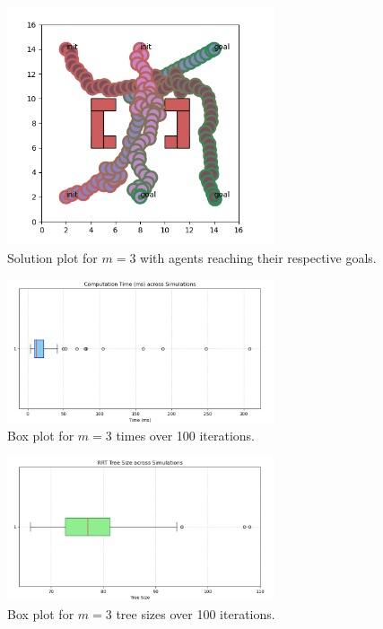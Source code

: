\documentclass{article}
\begin{document}
\begin{figure}[H]
    \centering
    \includegraphics[width=0.7\textwidth]{1b3plot.png} 
    \caption{Solution plot for \(m = 3\) with agents reaching their respective goals.}
    \label{fig:1b3plot}
\end{figure}

\begin{figure}[H]
    \centering
    \includegraphics[width=0.7\textwidth]{1c3time.png} 
    \caption{Box plot for \(m = 3\) times over 100 iterations.}
    \label{fig:ic3time}
\end{figure}

\begin{figure}[H]
    \centering
    \includegraphics[width=0.7\textwidth]{1c3size.png} 
    \caption{Box plot for \(m = 3\) tree sizes over 100 iterations.}
    \label{fig:ic3size}
\end{figure}
\end{document}
